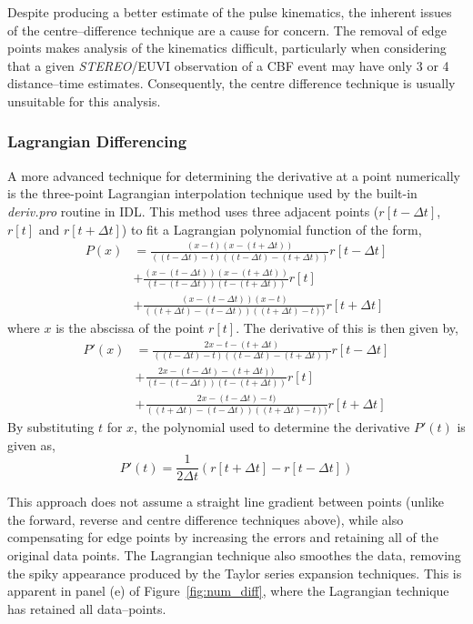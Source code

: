 Despite producing a better estimate of the pulse kinematics, the inherent issues of the centre--difference technique are a cause for concern. The removal of edge points makes analysis of the kinematics difficult, particularly when considering that a given \emph{STEREO}/EUVI observation of a CBF event may have only 3 or 4 distance--time estimates. Consequently, the centre difference technique is usually unsuitable for this analysis.


\subsubsection{Lagrangian Differencing}
\label{subsubsect:l_diff}

A more advanced technique for determining the derivative at a point numerically is the three-point Lagrangian interpolation technique used by the built-in \emph{deriv.pro} routine in IDL. This method uses three adjacent points ($r[t-\Delta t]$, $r[t]$ and $r[t+ \Delta t]$) to fit a Lagrangian polynomial function of the form,
\begin{align}
P(x) &= \frac{(x - t)(x - (t+\Delta t))}{((t-\Delta t) - t)((t-\Delta t) - (t+\Delta t))}r[t-\Delta t] \nonumber \\
&+ \frac{(x - (t-\Delta t))(x - (t+\Delta t))}{(t - (t-\Delta t))(t - (t+\Delta t))}r[t] \nonumber \\ 
&+ \frac{(x - (t-\Delta t))(x - t)}{((t+\Delta t) - (t-\Delta t))((t+\Delta t) - t))}r[t+\Delta t]
\end{align}
where $x$ is the abscissa of the point $r[t]$. The derivative of this is then given by,
\begin{align}
P'(x) &= \frac{2x - t - (t+\Delta t)}{((t-\Delta t) - t)((t-\Delta t) - (t+\Delta t))}r[t-\Delta t] \nonumber \\
&+ \frac{2x - (t-\Delta t) - (t+\Delta t))}{(t - (t-\Delta t))(t - (t+\Delta t))}r[t] \nonumber \\ 
&+ \frac{2x - (t-\Delta t) - t)}{((t+\Delta t) - (t-\Delta t))((t+\Delta t) - t))}r[t+\Delta t]
\end{align}
By substituting $t$ for $x$, the polynomial used to determine the derivative $P'(t)$ is given as,
\begin{equation}
P'(t) = \frac{1}{2\Delta t}(r[t+\Delta t] - r[t-\Delta t])
\end{equation}

This approach does not assume a straight line gradient between points (unlike the forward, reverse and centre difference techniques above), while also compensating for edge points by increasing the errors and retaining all of the original data points. The Lagrangian technique also smoothes the data, removing the spiky appearance produced by the Taylor series expansion techniques. This is apparent in panel (e) of Figure~\ref{fig:num_diff}, where the Lagrangian technique has retained all data--points.

